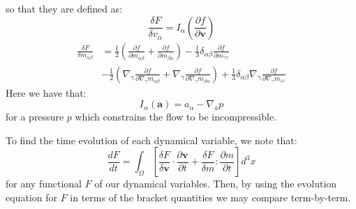 \documentclass[reqno]{article}
\begin{document}
  so that they are defined as:
  \begin{equation}
    \frac{\delta F}{\delta v_\alpha}
    = I_\alpha \left( \frac{\partial f}{\partial \mathbf{v}} \right)
  \end{equation}
  \begin{equation}
    \begin{split}
    \frac{\delta F}{\delta m_{\alpha \beta}}
    &=
    \frac12 \left( \frac{\partial f}{\partial m_{\alpha\beta}} + \frac{\partial f}{\partial m_{\beta \alpha}} \right)
    - \frac13 \delta_{\alpha \beta} \frac{\partial f}{\partial m_{\gamma \gamma}} \\
    &- \frac12 \left( \nabla_\gamma \frac{\partial f}{\partial \nabla_\gamma m_{\alpha\beta}}
      + \nabla_\gamma \frac{\partial f}{\partial \nabla_\gamma m_{\beta\alpha}}
    \right)
    + \frac13 \delta_{\alpha\beta} \nabla_\gamma \frac{\partial f}{\partial \nabla_\gamma m_{\varepsilon\varepsilon}}
    \end{split}
  \end{equation}
  Here we have that:
  \begin{equation}
    I_\alpha(\mathbf{a})
    =
    a_\alpha - \nabla_a p
  \end{equation}
  for a pressure $p$ which constrains the flow to be incompressible.

  To find the time evolution of each dynamical variable, we note that:
  \begin{equation}
    \frac{d F}{dt}
    =
    \int_\Omega
    \left[
      \frac{\delta F}{\delta \mathbf{v}} \cdot \frac{\partial \mathbf{v}}{\partial t}
      + \frac{\delta F}{\delta m} : \frac{\partial m}{\partial t}
    \right] d^3 x
  \end{equation}
  for any functional $F$ of our dynamical variables.
  Then, by using the evolution equation for $F$ in terms of the bracket
  quantities we may compare term-by-term.
\end{document}
